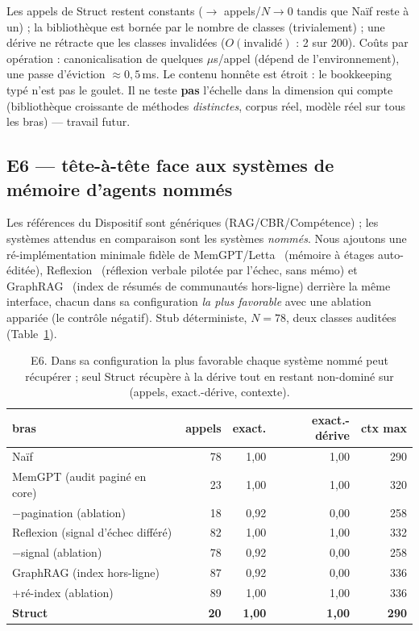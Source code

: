 \documentclass[11pt]{article}
\begin{document}
Les appels de Struct restent constants ($\to$ appels/$N\to0$ tandis que Naïf reste à un) ; la bibliothèque est
bornée par le nombre de classes (trivialement) ; une dérive ne rétracte que les classes invalidées
($O(\text{invalidé})$ : 2 sur 200). Coûts par opération : canonicalisation de quelques $\mu$s/appel
(dépend de l'environnement), une passe d'éviction $\approx0{,}5$\,ms. Le contenu honnête est étroit : le bookkeeping
typé n'est pas le goulet. Il ne teste \textbf{pas} l'échelle dans la dimension qui compte (bibliothèque croissante
de méthodes \emph{distinctes}, corpus réel, modèle réel sur tous les bras) --- travail futur.

\subsection{E6 --- tête-à-tête face aux systèmes de mémoire d'agents nommés}\label{sec:e6}
Les références du Dispositif sont génériques (RAG/CBR/Compétence) ; les systèmes attendus en comparaison sont les
systèmes \emph{nommés}. Nous ajoutons une ré-implémentation minimale fidèle de MemGPT/Letta~\cite{packer2023}
(mémoire à étages auto-éditée), Reflexion~\cite{shinn2023} (réflexion verbale pilotée par l'échec, sans mémo) et
GraphRAG~\cite{edge2024} (index de résumés de communautés hors-ligne) derrière la même interface, chacun dans sa
configuration \emph{la plus favorable} avec une ablation appariée (le contrôle négatif). Stub déterministe, $N=78$,
deux classes auditées (Table~\ref{tab:e6}).

\begin{table}[h]\centering
\begin{tabular}{lrrrr}
\toprule
bras & appels & exact. & exact.-dérive & ctx max \\
\midrule
Naïf & 78 & 1,00 & 1,00 & 290 \\
MemGPT (audit paginé en core) & 23 & 1,00 & 1,00 & 320 \\
\quad $-$pagination (ablation) & 18 & 0,92 & 0,00 & 258 \\
Reflexion (signal d'échec différé) & 82 & 1,00 & 1,00 & 332 \\
\quad $-$signal (ablation) & 78 & 0,92 & 0,00 & 258 \\
GraphRAG (index hors-ligne) & 87 & 0,92 & 0,00 & 336 \\
\quad $+$ré-index (ablation) & 89 & 1,00 & 1,00 & 336 \\
\textbf{Struct} & \textbf{20} & \textbf{1,00} & \textbf{1,00} & \textbf{290} \\
\bottomrule
\end{tabular}
\caption{E6. Dans sa configuration la plus favorable chaque système nommé peut récupérer ; seul Struct récupère à la dérive tout en restant non-dominé sur (appels, exact.-dérive, contexte).}
\label{tab:e6}
\end{table}
\end{document}
